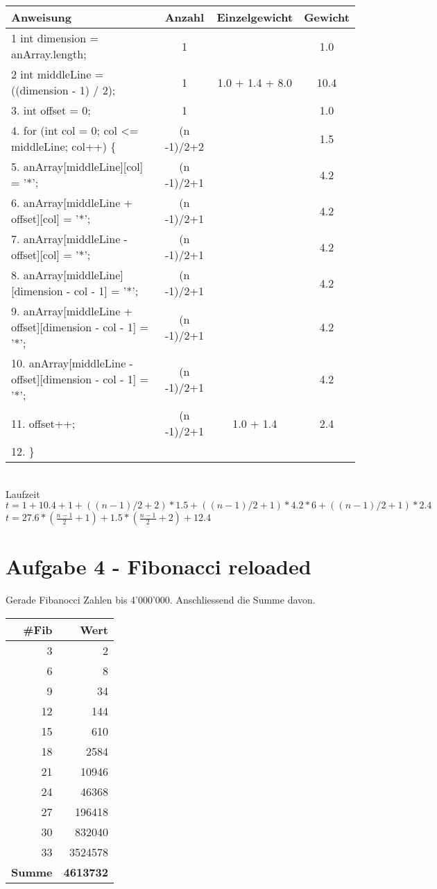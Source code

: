 \begin{tabular}{l | c | c | c |}
Anweisung & Anzahl & Einzelgewicht & Gewicht \\
\hline
1	int dimension = anArray.length;	&	1	&	& 	1.0		\\
2	int middleLine = ((dimension - 1) / 2);	&	1	&	1.0 + 1.4 + 8.0	& 	10.4	\\
3.	int offset = 0;	&	1	&	& 	1.0	\\
4.	for (int col = 0; col <= middleLine; col++) \{	&	(n -1)/2+2	& 	&  1.5		\\
5.	anArray[middleLine][col] = '*';	&	(n -1)/2+1	&	& 	4.2	\\
6.	anArray[middleLine + offset][col] = '*';	&	(n -1)/2+1	&	& 	4.2	\\
7.	anArray[middleLine - offset][col] = '*';	&	(n -1)/2+1	&	& 	4.2	\\
8.	anArray[middleLine][dimension - col - 1] = '*';	&	(n -1)/2+1	&	& 	4.2	\\
9.	anArray[middleLine + offset][dimension - col - 1] = '*';	&	(n -1)/2+1	&	& 	4.2	\\
10.	anArray[middleLine - offset][dimension - col - 1] = '*';	&	(n -1)/2+1	&	& 	4.2	\\
11.	offset++;	&		(n -1)/2+1		&	1.0 + 1.4	& 	2.4	\\
12.	\}
\end{tabular}\\
Laufzeit $t = 1 + 10.4 + 1 + ((n-1)/2 + 2)*1.5 + ((n-1)/2 + 1)*4.2*6 + ((n-1)/2 + 1)*2.4$\\
$t = 27.6*(\frac{n-1}{2} + 1) + 1.5*(\frac{n-1}{2} + 2) + 12.4 $\\

\clearpage

\section*{Aufgabe 4 - Fibonacci reloaded}
Gerade Fibanocci Zahlen bis 4'000'000.
Anschliessend die Summe davon.

\begin{center}
\small\renewcommand{\arraystretch}{1.4}
\small
{} %
\begin{tabularx}{0.25\textwidth}{rr}
\rowcolor{tableheadcolor}
\hline
\textbf{\#Fib} & \textbf{Wert} \\
\hline
3 & 2 \\
6 & 8 \\
9 & 34 \\
12 & \num{144} \\
15 & \num{610} \\
18 & \num{2584} \\
21 & \num{10946} \\
24 & \num{46368} \\
27 & \num{196418} \\
30 & \num{832040} \\
33 & \num{3524578} \\
\hline
\rowcolor{tablesubheadcolor}
\textbf{Summe} & \textbf{\num{4613732}}\\
\hline
\end{tabularx}
\end{center}
